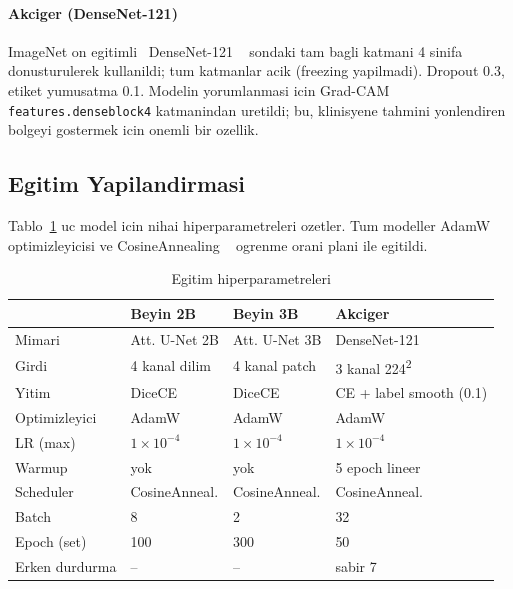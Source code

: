 \documentclass[conference]{IEEEtran}
\begin{document}
\paragraph{Akciger (DenseNet-121)}
ImageNet on egitimli~\cite{deng2009imagenet} DenseNet-121
~\cite{huang2017densenet} sondaki tam bagli katmani 4 sinifa donusturulerek
kullanildi; tum katmanlar acik (freezing yapilmadi). Dropout 0.3, etiket
yumusatma 0.1. Modelin yorumlanmasi icin Grad-CAM
~\cite{selvaraju2017gradcam} \texttt{features.denseblock4} katmanindan
uretildi; bu, klinisyene tahmini yonlendiren bolgeyi gostermek icin onemli bir
ozellik.

\subsection{Egitim Yapilandirmasi}

Tablo~\ref{tab:hparams} uc model icin nihai hiperparametreleri ozetler. Tum
modeller AdamW~\cite{loshchilov2019adamw} optimizleyicisi ve CosineAnnealing
~\cite{loshchilov2017sgdr} ogrenme orani plani ile egitildi.

\begin{table}[!t]
\caption{Egitim hiperparametreleri}
\label{tab:hparams}
\centering
\renewcommand{\arraystretch}{1.1}
\begin{tabularx}{\columnwidth}{l X X X}
\toprule
& \textbf{Beyin 2B} & \textbf{Beyin 3B} & \textbf{Akciger} \\
\midrule
Mimari        & Att. U-Net 2B & Att. U-Net 3B & DenseNet-121 \\
Girdi         & 4 kanal dilim & 4 kanal patch & 3 kanal 224\textsuperscript{2} \\
Yitim         & DiceCE        & DiceCE        & CE + label smooth (0.1) \\
Optimizleyici & AdamW         & AdamW         & AdamW \\
LR (max)      & $1\!\times\!10^{-4}$ & $1\!\times\!10^{-4}$ & $1\!\times\!10^{-4}$ \\
Warmup        & yok           & yok           & 5 epoch lineer \\
Scheduler     & CosineAnneal. & CosineAnneal. & CosineAnneal. \\
Batch         & 8             & 2             & 32 \\
Epoch (set)   & 100           & 300           & 50 \\
Erken durdurma& --            & --            & sabir 7 \\
\bottomrule
\end{tabularx}
\end{table}
\end{document}

